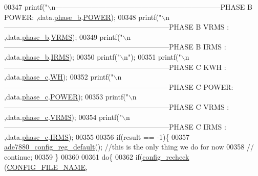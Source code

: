 \begin{DoxyCode}
{{{{{00347         printf(\textcolor{stringliteral}{"\(\backslash\)n---------------------------------------------------------------------PHASE B POWER: %
      ,data.\hyperlink{a00029_a48734adeb4d59d056b6e39c6e08fe21e}{phase\_b}.\hyperlink{a00030_a8a9794fa4c6a69b457d1eb04b017ef1e}{POWER});
00348         printf(\textcolor{stringliteral}{"\(\backslash\)n---------------------------------------------------------------------PHASE B VRMS : %
      ,data.\hyperlink{a00029_a48734adeb4d59d056b6e39c6e08fe21e}{phase\_b}.\hyperlink{a00030_a08415029e214174a01bc6487ff98ee9b}{VRMS});
00349         printf(\textcolor{stringliteral}{"\(\backslash\)n---------------------------------------------------------------------PHASE B IRMS : %
      ,data.\hyperlink{a00029_a48734adeb4d59d056b6e39c6e08fe21e}{phase\_b}.\hyperlink{a00030_a4f87f30b543e89e2e5dfa1b8f3f58eff}{IRMS});
00350         printf(\textcolor{stringliteral}{"\(\backslash\)n"});
00351         printf(\textcolor{stringliteral}{"\(\backslash\)n---------------------------------------------------------------------PHASE C KWH  : %
      ,data.\hyperlink{a00029_ad8892f27909cf51f7603adfc00d224df}{phase\_c}.\hyperlink{a00030_a8dd6d8406db4e214238b3eff481e4ea0}{WH});
00352         printf(\textcolor{stringliteral}{"\(\backslash\)n---------------------------------------------------------------------PHASE C POWER: %
      ,data.\hyperlink{a00029_ad8892f27909cf51f7603adfc00d224df}{phase\_c}.\hyperlink{a00030_a8a9794fa4c6a69b457d1eb04b017ef1e}{POWER});
00353         printf(\textcolor{stringliteral}{"\(\backslash\)n---------------------------------------------------------------------PHASE C VRMS : %
      ,data.\hyperlink{a00029_ad8892f27909cf51f7603adfc00d224df}{phase\_c}.\hyperlink{a00030_a08415029e214174a01bc6487ff98ee9b}{VRMS});
00354         printf(\textcolor{stringliteral}{"\(\backslash\)n---------------------------------------------------------------------PHASE C IRMS : %
      ,data.\hyperlink{a00029_ad8892f27909cf51f7603adfc00d224df}{phase\_c}.\hyperlink{a00030_a4f87f30b543e89e2e5dfa1b8f3f58eff}{IRMS});
00355                      
00356         \textcolor{keywordflow}{if}(result == -1)\{            
00357             \hyperlink{a00005_ga7782772c18e6ea515dcd28dcaedd0f06}{ade7880\_config\_reg\_default}(); \textcolor{comment}{//this is the only thing we do for now}
00358         \textcolor{comment}{//  continue;}
00359         \}
00360         
00361         \textcolor{keywordflow}{do}\{
00362         \textcolor{keywordflow}{if}(\hyperlink{a00003_gac93e16d1e9d6a04b52373bf3428cc79c}{config\_recheck} (\hyperlink{a00037_a62921b92fa4fb37f1e3a5d4c644fc1d8}{CONFIG\_FILE\_NAME},
}}}}}}}}}}}}
\end{DoxyCode}

